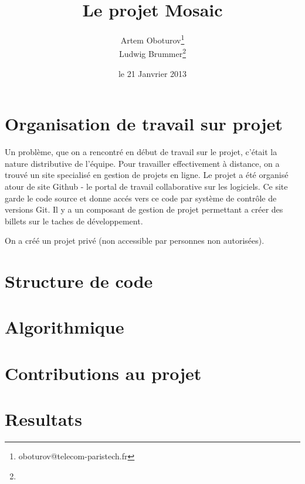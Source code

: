 \documentclass[a4paper]{article}
\begin{document}
\listoftodos

\title{Le projet Mosaic}
\author{
  Artem Oboturov\thanks{oboturov@telecom-paristech.fr}
  \\Ludwig Brummer\thanks{}
}
\date{le 21 Janvrier 2013}
\maketitle

\section{Organisation de travail sur projet}
Un probl\`eme, que on a rencontr\'e en d\'ebut de travail sur le projet, c'\'etait la nature distributive de l'\'equipe.
Pour travailler effectivement \`a distance, on a trouv\'e un site specialis\'e en gestion de projets en ligne.
Le projet a \'et\'e organis\'e atour de site Github - le portal de travail collaborative sur les logiciels.
Ce site garde le code source et donne acc\'es vers ce code par syst\`eme de contr\^ole de versions Git.
Il y a un composant de gestion de projet permettant a cr\'eer des billets sur le taches de d\'eveloppement.

On a cr\'e\'e un projet priv\'e (non accessible par personnes non autoris\'ees).

\section{Structure de code}

\section{Algorithmique}

\section{Contributions au projet}

\section{Resultats}

%		
\end{document}
